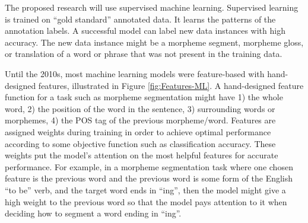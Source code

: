 



The proposed research will use supervised machine learning. Supervised learning is trained on ``gold standard'' annotated data. It learns the patterns of the annotation labels. A successful model can label new data instances with high accuracy. The new data instance might be a morpheme segment, morpheme gloss, or translation of a word or phrase that was not present in the training data. 



Until the 2010s, most machine learning models were feature-based with hand-designed features, illustrated in Figure \ref{fig:Features-ML}. 
A hand-designed feature function for a task such as morpheme segmentation might have 1) the whole word, 2) the position of the word in the sentence, 3) surrounding words or morphemes, 4) the POS tag of the previous morpheme/word. Features are assigned weights during training in order to achieve optimal performance according to some objective function such as classification accuracy. These weights put the model's attention on the most helpful features for accurate performance. For example, in a morpheme segmentation task where one chosen feature is the previous word and the previous word is some form of the English ``to be'' verb, and the target word ends in ``ing'', then the model might give a high weight to the previous word so that the model pays attention to it when deciding how to segment a word ending in ``ing''. 

